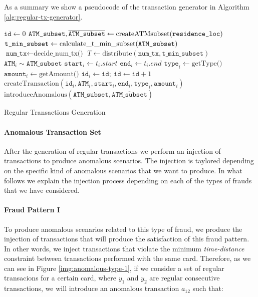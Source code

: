 \documentclass{article}
\begin{document}
As a summary we show a pseudocode of the transaction generator in Algorithm \ref{alg:regular-tx-generator}.

\begin{algorithm}[H]
  \small
  \begin{algorithmic}[1]
  \STATE $\texttt{id} \gets 0$
    \STATE $\texttt{ATM\_subset}, \overline{\texttt{ATM\_subset}} \gets \text{createATMsubset(\texttt{residence\_loc})}$
    \STATE $\texttt{t\_min\_subset} \gets \text{calculate\_t\_min\_subset(\texttt{ATM\_subset})}$
    \STATE $\texttt{num\_tx} \gets \text{decide\_num\_tx()}$
    \STATE $T \gets \text{distribute}(\texttt{num\_tx}, \texttt{t\_min\_subset})$
        \STATE $\texttt{ATM}_{i} \sim \texttt{ATM\_subset}$
        \STATE $\texttt{start}_{i} \gets t_i.start$
        \STATE $\texttt{end}_{i} \gets t_i.end$
        \STATE $\texttt{type}_{i} \gets \text{getType()}$
        \STATE $\texttt{amount}_{i} \gets \text{getAmount()}$
        \STATE $\texttt{id}_{i} \gets \texttt{id}; \ \texttt{id} \gets \texttt{id} + 1$
        \STATE $\text{createTransaction}(\texttt{id}_{i}, \texttt{ATM}_i, \texttt{start}_{i},\texttt{end}_{i}, \texttt{type}_{i}, \texttt{amount}_i)$
    \ENDFOR
    \STATE $\text{introduceAnomalous}(\texttt{ATM\_subset}, \overline{\texttt{ATM\_subset}})$
  \ENDFOR
  \end{algorithmic}
  \caption{Regular Transactions Generation}
  \label{alg:regular-tx-generator}
\end{algorithm}

\paragraph{Anomalous Transaction Set\\}

After the generation of regular transactions we perform an injection of transactions to produce anomalous scenarios. The injection is taylored depending on the specific kind of 
anomalous scenarios that we want to produce. In what follows we explain the injection process depending on each of the types of frauds that we have considered.

\paragraph{Fraud Pattern I}

To produce anomalous scenarios related to this type of fraud, we produce the injection
of transactions that will produce the satisfaction of this fraud pattern. In other words,
we inject transactions that violate the minimum \emph{time-distance} constraint between transactions performed with the same card. Therefore, as we can see in Figure \ref{img:anomalous-type-1}, if we consider a set of regular transacions for a certain card, where $y_1$ and $y_2$ are regular consecutive transactions, we will introduce an anomalous transaction $a_{12}$ such that: 
\end{document}
